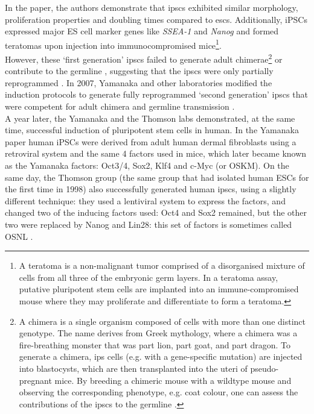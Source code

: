 In the paper, the authors demonstrate that \glspl{ipsc} exhibited similar morphology, proliferation properties and doubling times compared to \glspl{esc}.
Additionally, iPSCs expressed major ES cell marker genes like \textit{SSEA-1} and \textit{Nanog} and formed teratomas upon injection into immunocompromised mice\footnote{A teratoma is a non-malignant tumor comprised of a disorganised mixture of cells from all three of the embryonic germ layers. 
In a teratoma assay, putative pluripotent stem cells are implanted into an immune-compromised mouse where they may proliferate and differentiate to form a teratoma. }.\\ 

However, these `first generation' \glspl{ipsc} failed to generate adult chimerae\footnote{A chimera is a single organism composed of cells with more than one distinct genotype.
The name derives from Greek mythology, where a chimera was a fire-breathing monster that was part lion, part goat, and part dragon. 
To generate a chimera, \gls{ips} cells (e.g. with a gene-specific mutation) are injected into blastocysts, which are then transplanted into the uteri of pseudo-pregnant mice.
By breeding a chimeric mouse with a wildtype mouse and observing the corresponding phenotype, e.g. coat colour, one can assess the contributions of the \glspl{ipsc} to the germline \cite{okita2007generation}.} or contribute to the germline \cite{takahashi2006induction}, suggesting that the \glspl{ipsc} were only partially reprogrammed \cite{omole2018ten}. 
In 2007, Yamanaka and other laboratories modified the induction protocols to generate fully reprogrammed `second generation' \glspl{ipsc} that were competent for adult chimera and germline transmission \cite{maherali2007directly, wernig2007vitro, okita2007generation}.\\

A year later, the Yamanaka and the Thomson labs demonstrated, at the same time, successful induction of pluripotent stem cells in human.
In the Yamanaka paper \cite{takahashi2007induction} human iPSCs were derived from adult human dermal fibroblasts using a retroviral system and the same 4 factors used in mice, which later became known as the Yamanaka factors: Oct3/4, Sox2, Klf4 and c-Myc (or OSKM).
On the same day, the Thomson group (the same group that had isolated human ESCs for the first time in 1998) also successfully generated human \glspl{ipsc}, using a slightly different technique: they used a lentiviral system to express the factors, and changed two of the inducing factors used: Oct4 and Sox2 remained, but the other two were replaced by Nanog and Lin28: this set of factors is sometimes called OSNL \cite{yu2007induced}.\\

